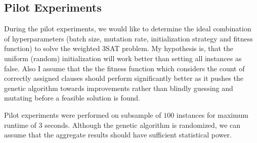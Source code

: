\documentclass[a4paper,10pt]{article}
\begin{document}
\subsection{Pilot Experiments}

During the pilot experiments, we would like to determine the ideal combination of hyperparameters (batch size, mutation rate, initialization strategy and fitness function) to solve the weighted 3SAT problem. My hypothesis is, that the uniform (random) initialization will work better than setting all instances as false. Also I assume that the the fitness function which considers the count of correctly assigned clauses should perform significantly better as it pushes the genetic algorithm towards improvements rather than blindly guessing and mutating before a feasible solution is found.

Pilot experiments were performed on subsample of $100$ instances for maximum runtime of $3$ seconds. Although the genetic algorithm is randomized, we can assume that the aggregate results should have sufficient statistical power.
\end{document}
